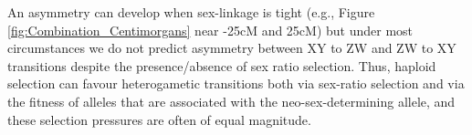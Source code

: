 \documentclass[12pt]{article}
\begin{document}
An asymmetry can develop when sex-linkage is tight (e.g., Figure \ref{fig:Combination_Centimorgans} near -25cM and 25cM) but under most circumstances we do not predict asymmetry between XY to ZW and ZW to XY transitions despite the presence/absence of sex ratio selection. 
Thus, haploid selection can favour heterogametic transitions both via sex-ratio selection and via the fitness of alleles that are associated with the neo-sex-determining allele, and these selection pressures are often of equal magnitude. 



\end{document}
